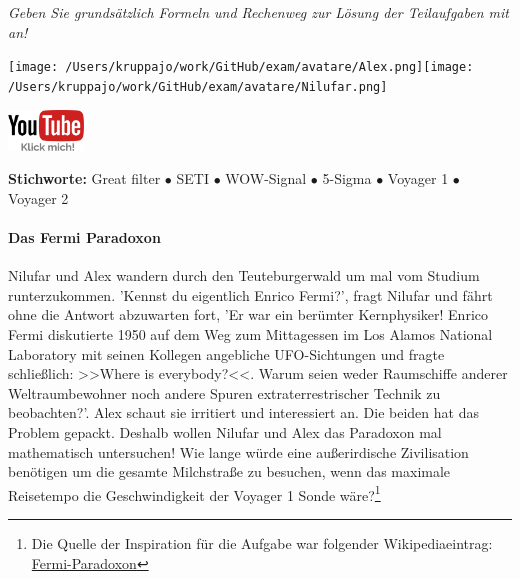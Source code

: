 \documentclass[a4paper, 9pt]{scrartcl}\usepackage[]{graphicx}\usepackage[]{xcolor}
\begin{document}
\textit{Geben Sie grundsätzlich Formeln und Rechenweg zur Lösung der Teilaufgaben mit an!} \\[1Ex]
 

 
\ifcollection
\begin{flushright}
\tiny\vspace{-3Ex}
\textbf{\examinhaltstart}
\exammodulemathstat
\vspace{-4Ex}
\end{flushright}
\begin{minipage}[t]{0.5\textwidth}
\texttt{[image: /Users/kruppajo/work/GitHub/exam/avatare/Alex.png]}\hspace{-4mm}\texttt{[image: /Users/kruppajo/work/GitHub/exam/avatare/Nilufar.png]}
\end{minipage}
\begin{minipage}[t]{0.5\textwidth}
\hfill
\href{https://youtu.be/iCQogS6KhPM}{\includegraphics[width = 2cm]{img/youtube}}
\end{minipage}
\fi

{\tiny\textbf{Stichworte:} Great filter $\bullet$ SETI $\bullet$ WOW-Signal $\bullet$ 5-Sigma $\bullet$ Voyager 1 $\bullet$ Voyager 2}




\ifcollection
\paragraph{Das Fermi Paradoxon}
\fi



Nilufar und Alex wandern durch den Teuteburgerwald um mal vom Studium runterzukommen. 'Kennst du eigentlich Enrico Fermi?', fragt Nilufar und fährt ohne die Antwort abzuwarten fort, 'Er war ein berümter Kernphysiker! Enrico Fermi diskutierte 1950 auf dem Weg zum Mittagessen im Los Alamos National Laboratory mit seinen Kollegen angebliche UFO-Sichtungen und fragte schließlich: >>Where is everybody?<<. Warum seien weder Raumschiffe anderer Weltraumbewohner noch andere Spuren extraterrestrischer Technik zu beobachten?'. Alex schaut sie irritiert und interessiert an. Die beiden hat das Problem gepackt. Deshalb wollen Nilufar und Alex das Paradoxon mal mathematisch untersuchen! Wie lange würde eine außerirdische Zivilisation benötigen um die gesamte Milchstraße zu besuchen, wenn das maximale Reisetempo die Geschwindigkeit der Voyager 1 Sonde wäre?\footnote{Die Quelle der Inspiration für die Aufgabe war folgender Wikipediaeintrag: \href{https://de.wikipedia.org/wiki/Fermi-Paradoxon}{Fermi-Paradoxon}}\\[-1ex]
\end{document}
